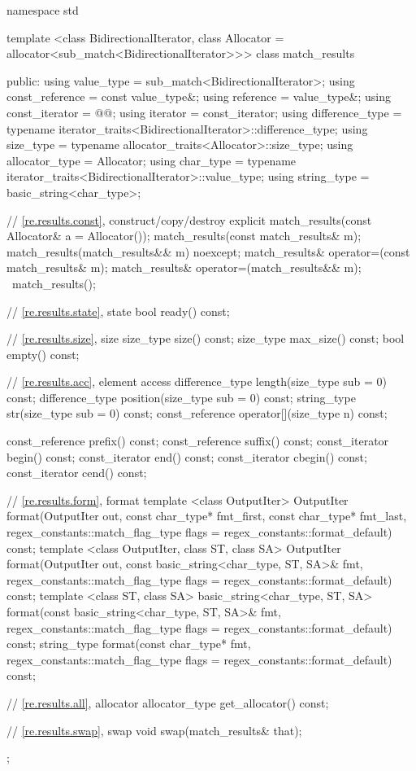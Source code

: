 \begin{codeblock}
namespace std {
  template <class BidirectionalIterator,
            class Allocator = allocator<sub_match<BidirectionalIterator>>>
  class match_results {
  public:
     using value_type      = sub_match<BidirectionalIterator>;
     using const_reference = const value_type&;
     using reference       = value_type&;
     using const_iterator  = @{\impdef}@;
     using iterator        = const_iterator;
     using difference_type =
             typename iterator_traits<BidirectionalIterator>::difference_type;
     using size_type       = typename allocator_traits<Allocator>::size_type;
     using allocator_type  = Allocator;
     using char_type       =
             typename iterator_traits<BidirectionalIterator>::value_type;
     using string_type     = basic_string<char_type>;

     // \ref{re.results.const}, construct/copy/destroy
     explicit match_results(const Allocator& a = Allocator());
     match_results(const match_results& m);
     match_results(match_results&& m) noexcept;
     match_results& operator=(const match_results& m);
     match_results& operator=(match_results&& m);
     ~match_results();

     // \ref{re.results.state}, state
     bool ready() const;

     // \ref{re.results.size}, size
     size_type size() const;
     size_type max_size() const;
     bool empty() const;

     // \ref{re.results.acc}, element access
     difference_type length(size_type sub = 0) const;
     difference_type position(size_type sub = 0) const;
     string_type str(size_type sub = 0) const;
     const_reference operator[](size_type n) const;

     const_reference prefix() const;
     const_reference suffix() const;
     const_iterator begin() const;
     const_iterator end() const;
     const_iterator cbegin() const;
     const_iterator cend() const;

     // \ref{re.results.form}, format
     template <class OutputIter>
      OutputIter
      format(OutputIter out,
             const char_type* fmt_first, const char_type* fmt_last,
             regex_constants::match_flag_type flags =
              regex_constants::format_default) const;
     template <class OutputIter, class ST, class SA>
       OutputIter
       format(OutputIter out,
              const basic_string<char_type, ST, SA>& fmt,
              regex_constants::match_flag_type flags =
                regex_constants::format_default) const;
     template <class ST, class SA>
      basic_string<char_type, ST, SA>
      format(const basic_string<char_type, ST, SA>& fmt,
             regex_constants::match_flag_type flags =
               regex_constants::format_default) const;
     string_type
     format(const char_type* fmt,
            regex_constants::match_flag_type flags =
              regex_constants::format_default) const;

     // \ref{re.results.all}, allocator
     allocator_type get_allocator() const;

     // \ref{re.results.swap}, swap
     void swap(match_results& that);
  };
}
\end{codeblock}

